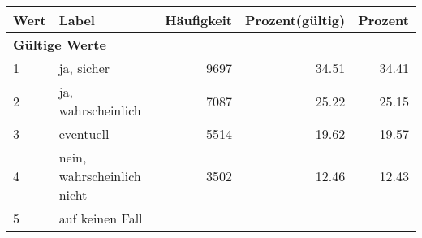      \begin{longtable}{lXrrr}
     \toprule
     \textbf{Wert} & \textbf{Label} & \textbf{Häufigkeit} & \textbf{Prozent(gültig)} & \textbf{Prozent} \\
     \endhead
     \midrule
     \multicolumn{5}{l}{\textbf{Gültige Werte}}\\

     1 &
     \multicolumn{1}{X}{ ja, sicher   } &


       \num{9697} &
       \num[round-mode=places,round-precision=2]{34.51} &
         \num[round-mode=places,round-precision=2]{34.41} \\

     2 &
     \multicolumn{1}{X}{ ja, wahrscheinlich   } &


       \num{7087} &
       \num[round-mode=places,round-precision=2]{25.22} &
         \num[round-mode=places,round-precision=2]{25.15} \\

     3 &
     \multicolumn{1}{X}{ eventuell   } &


       \num{5514} &
       \num[round-mode=places,round-precision=2]{19.62} &
         \num[round-mode=places,round-precision=2]{19.57} \\

     4 &
     \multicolumn{1}{X}{ nein, wahrscheinlich nicht   } &


       \num{3502} &
       \num[round-mode=places,round-precision=2]{12.46} &
         \num[round-mode=places,round-precision=2]{12.43} \\

     5 &
     \multicolumn{1}{X}{ auf keinen Fall   } &



\end{longtable}

